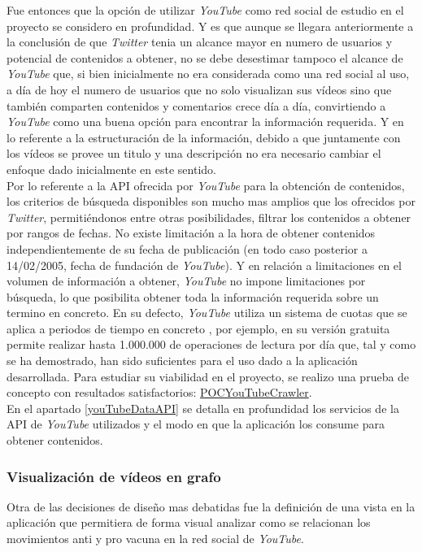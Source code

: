 \documentclass[11pt,a4paper]{article}
\begin{document}
Fue entonces que la opción de utilizar \textit{YouTube} como red social de estudio en el proyecto se considero en profundidad. Y es que aunque se llegara anteriormente a la conclusión de que \textit{Twitter} tenia un alcance mayor en numero de usuarios y potencial de contenidos a obtener, no se debe desestimar tampoco el alcance de \textit{YouTube} que, si bien inicialmente no era considerada como una red social al uso, a día de hoy el numero de usuarios que no solo visualizan sus vídeos sino que también comparten contenidos y comentarios crece día a día, convirtiendo a \textit{YouTube} como una buena opción para encontrar la información requerida. Y en lo referente a la estructuración de la información, debido a que juntamente con los vídeos se provee un titulo y una descripción no era necesario cambiar el enfoque dado inicialmente en este sentido.
\\

Por lo referente a la API ofrecida por \textit{YouTube} para la obtención de contenidos, los criterios de búsqueda disponibles son mucho mas amplios que los ofrecidos por \textit{Twitter}, permitiéndonos entre otras posibilidades, filtrar los contenidos a obtener por rangos de fechas. No existe limitación a la hora de obtener contenidos independientemente de su fecha de publicación (en todo caso posterior a 14/02/2005, fecha de fundación de \textit{YouTube}). Y en relación a limitaciones en el volumen de información a obtener, \textit{YouTube} no impone limitaciones por búsqueda, lo que posibilita obtener toda la información requerida sobre un termino en concreto. En su defecto, \textit{YouTube} utiliza un sistema de cuotas que se aplica a periodos de tiempo en concreto \cite{18}, por ejemplo, en su versión gratuita permite realizar hasta 1.000.000 de operaciones de lectura por día que, tal y como se ha demostrado, han sido suficientes para el uso dado a la aplicación desarrollada. Para estudiar su viabilidad en el proyecto, se realizo una prueba de concepto con resultados satisfactorios: \href{https://github.com/jsanchezmend/TFGAntivacunas/tree/master/POCYouTubeCrawler}{POCYouTubeCrawler}.
\\

En el apartado \ref{youTubeDataAPI} se detalla en profundidad los servicios de la API de \textit{YouTube} utilizados y el modo en que la aplicación los consume para obtener contenidos. 
\medskip 

\subsubsection{Visualización de vídeos en grafo}\label{propuestaGrafo} 
Otra de las decisiones de diseño mas debatidas fue la definición de una vista en la aplicación que permitiera de forma visual analizar como se relacionan los movimientos anti y pro vacuna en la red social de \textit{YouTube}. 
\\
\end{document}
